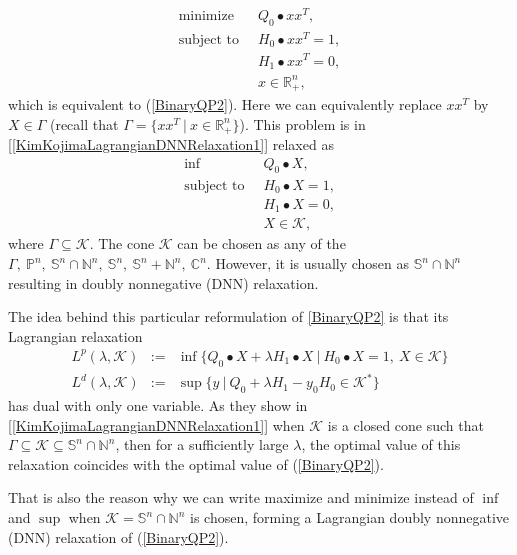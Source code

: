 \documentclass[12pt]{book}
\theoremstyle{definition}
\begin{document}
\begin{equation}
\label{BinaryQOP3}
\begin{array}{ll}
\mbox{minimize } 	& \ Q_0\bullet xx^T, \\
\mbox{subject to } 	& \ H_0\bullet xx^T = 1, \\
			& \ H_1\bullet xx^T = 0, \\
			& \ x\in\mathbb{R}^n_+,
\end{array}
\end{equation}
which is equivalent to (\ref{BinaryQP2}).  Here we can equivalently replace $xx^T$ by $X\in\Gamma$ (recall that $\Gamma = \{ xx^T \ \vert \ x\in\mathbb{R}^n_+ \}$). This problem is in [\ref{KimKojimaLagrangianDNNRelaxation1}] relaxed as 
\begin{equation}
\label{BinaryQOP3Relax}
\begin{array}{ll}
\mbox{inf } 	& \ Q_0\bullet X, \\ %
\mbox{subject to } 	& \ H_0\bullet X = 1, \\
			& \ H_1\bullet X = 0, \\
			& \ X\in\mathcal{K},
\end{array}
\end{equation}
where $\Gamma\subseteq\mathcal{K}$. The cone $\mathcal{K}$ can be chosen as any of the 
 $\Gamma, \ \mathbb{P}^n ,\ \mathbb{S}^n \cap \mathbb{N}^n , \ \mathbb{S}^n , \ \mathbb{S}^n + \mathbb{N}^n , \ \mathbb{C}^n. $ However, it is usually chosen as $\mathbb{S}^n \cap \mathbb{N}^n$ resulting in doubly nonnegative (DNN) relaxation.

The idea behind this particular reformulation of \ref{BinaryQP2} is that its Lagrangian relaxation 
\begin{eqnarray}
\label{LagrangianDNNPrimalDualPair1}
L^p(\lambda, \mathcal{K}) &:=& \inf \{ Q_0\bullet X + \lambda H_1\bullet X\ \vert \ H_0\bullet X = 1, \ X\in \mathcal{K} \} \\
\label{LagrangianDNNPrimalDualPair2}
L^d(\lambda, \mathcal{K}) &:=& \sup \{ y\ \vert \  Q_0 + \lambda H_1 - y_0H_0  \in \mathcal{K}^* \}
\end{eqnarray}
has dual with only one variable. 
As they show in [\ref{KimKojimaLagrangianDNNRelaxation1}] when $\mathcal{K}$ is a closed cone such that $\Gamma \subseteq \mathcal{K} \subseteq \mathbb{S}^n \cap \mathbb{N}^n$, then for a sufficiently large $\lambda$, the optimal value of this relaxation coincides with the optimal value of (\ref{BinaryQP2}).

That is also the reason why we can write maximize and minimize instead of $\inf$ and $\sup$ when 
$\mathcal{K} = \mathbb{S}^n \cap \mathbb{N}^n$ is chosen, forming a Lagrangian doubly nonnegative (DNN) relaxation of (\ref{BinaryQP2}).
\end{document}
